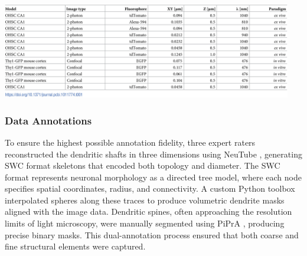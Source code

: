 \begin{center}
\includegraphics[width=0.95\textwidth]{figures/56_dataset_description.png}
\label{fig:dataset_description}
\end{center}



\subsubsection{\textbf{Data Annotations}}
To ensure the highest possible annotation fidelity, three expert raters reconstructed the dendritic shafts in three dimensions using NeuTube \cite{Feng_2015}, generating SWC format \cite{Cannon_1998} skeletons that encoded both topology and diameter. The SWC format represents neuronal morphology as a directed tree model, where each node specifies spatial coordinates, radius, and connectivity. A custom Python toolbox interpolated spheres along these traces to produce volumetric dendrite masks aligned with the image data. Dendritic spines, often approaching the resolution limits of light microscopy, were manually segmented using \gls{PiPrA} \cite{Anki_Pipra}, producing precise binary masks. This dual-annotation process ensured that both coarse and fine structural elements were captured.

